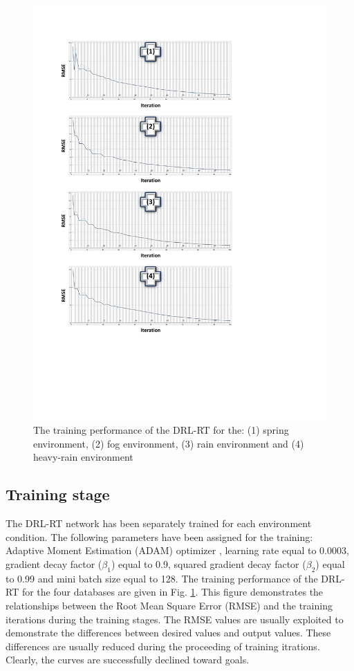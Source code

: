 \documentclass{svproc}
\begin{document}
\begin{figure}[!t]
	\centering
	\includegraphics[scale=.67,trim=2cm 6cm 6.5cm 2cm,clip]{training_curves.pdf}
	\caption{The training performance of the DRL-RT for the: (1) spring environment, (2) fog environment, (3) rain environment and (4) heavy-rain environment}
	\label{fig:training_curves}
\end{figure}

\subsection{Training stage} 
The  DRL-RT network has been separately trained for each environment condition. The following parameters have been assigned for the training: Adaptive Moment Estimation (ADAM) optimizer \cite{kingma2014adam}, learning rate equal to 0.0003, gradient decay factor ($\beta_1$) equal to 0.9, squared gradient decay factor ($\beta_2$) equal to 0.99 and mini batch size equal to 128. The training performance of the DRL-RT for the four databases are given in Fig. \ref{fig:training_curves}. This figure demonstrates the relationships between the Root Mean Square Error (RMSE) and the training iterations during the training stages. The RMSE values are usually exploited to demonstrate the differences between desired values and output values.	These differences are usually reduced during the proceeding of training itrations. Clearly, the curves are successfully declined toward goals.
\end{document}
